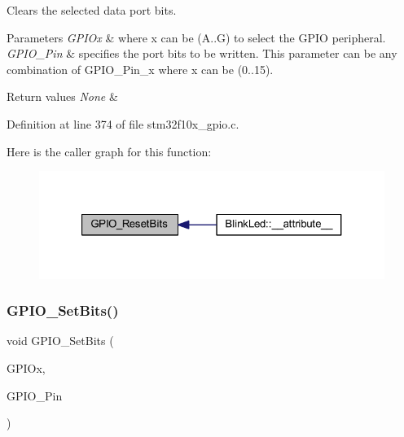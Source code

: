 Clears the selected data port bits. 


\begin{DoxyParams}{Parameters}
{\em G\+P\+I\+Ox} & where x can be (A..G) to select the G\+P\+IO peripheral. \\
\hline
{\em G\+P\+I\+O\+\_\+\+Pin} & specifies the port bits to be written. This parameter can be any combination of G\+P\+I\+O\+\_\+\+Pin\+\_\+x where x can be (0..15). \\
\hline
\end{DoxyParams}

\begin{DoxyRetVals}{Return values}
{\em None} & \\
\hline
\end{DoxyRetVals}


Definition at line 374 of file stm32f10x\+\_\+gpio.\+c.

Here is the caller graph for this function\+:
\nopagebreak
\begin{figure}[H]
\begin{center}
\leavevmode
\includegraphics[width=321pt]{group___g_p_i_o___exported___functions_ga6fcd35b207a66608dd2c9d7de9247dc8_icgraph}
\end{center}
\end{figure}
\mbox{\label{group___g_p_i_o___exported___functions_ga9e1352eed7c6620e18af2d86f6b6ff8e}} 
\subsubsection{\texorpdfstring{G\+P\+I\+O\+\_\+\+Set\+Bits()}{GPIO\_SetBits()}}
{\footnotesize\ttfamily void G\+P\+I\+O\+\_\+\+Set\+Bits (\begin{DoxyParamCaption}\item[{\hyperlink{struct_g_p_i_o___type_def}{G\+P\+I\+O\+\_\+\+Type\+Def} $\ast$}]{G\+P\+I\+Ox,  }\item[{uint16\+\_\+t}]{G\+P\+I\+O\+\_\+\+Pin }\end{DoxyParamCaption})}



